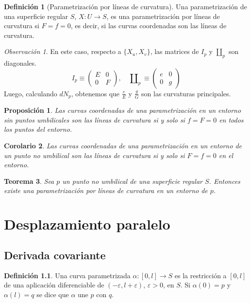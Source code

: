 \documentclass{report}
\newtheorem{theorem}{Teorema}[chapter]
\newtheorem{corollary}[theorem]{Corolario}
\newtheorem{proposition}[theorem]{Proposición}
\theoremstyle{remark}
\newtheorem*{remark}{Observación}
\theoremstyle{remark}
\theoremstyle{definition}
\newtheorem{definition}{Definición}[chapter]
\theoremstyle{definition}
\theoremstyle{definition}
\begin{document}
\begin{definition}[Parametrización por líneas de curvatura]
    Una parametrización de una superficie regular $S$, $X: U \to S$, es una parametrización por líneas de curvatura si $F = f = 0$, es decir, si las curvas coordenadas son las líneas de curvatura.
\end{definition}

\begin{remark}
    En este caso, respecto a $\{X_u, X_v\}$, las matrices de $I_p$ y $\amalg_p$ son diagonales.
    $$I_p \equiv
        \begin{pmatrix}
            E & 0 \\
            0 & F
        \end{pmatrix}, \quad
        \amalg_p \equiv
        \begin{pmatrix}
            e & 0 \\
            0 & g
        \end{pmatrix}$$
    Luego, calculando $dN_p$, obtenemos que $\frac{e}{E}$ y $\frac{g}{G}$ son las curvaturas principales.
\end{remark}

\begin{proposition}
    Las curvas coordenadas de una parametrización en un entorno sin puntos umbilicales son las líneas de curvatura si y solo si $f = F = 0$ en todos los puntos del entorno.
\end{proposition}

\begin{corollary}
    Las curvas coordenadas de una parametrización en un entorno de un punto no umbilical son las líneas de curvatura si y solo si $F = f = 0$ en el entorno.
\end{corollary}

\begin{theorem}
    Sea $p$ un punto no umbilical de una superficie regular $S$.
    Entonces existe una parametrización por líneas de curvatura en un entorno de $p$.
\end{theorem}

\chapter{Desplazamiento paralelo}
\section{Derivada covariante}

\begin{definition}
    Una curva parametrizada $\alpha : [0, l] \to S$ es la restricción a $[0, l]$ de una aplicación diferenciable de $(-\varepsilon, l+\varepsilon)$, $\varepsilon>0$, en $S$.
    Si $\alpha(0) = p$ y $\alpha(l) = q$ se dice que $\alpha$ une $p$ con $q$.
\end{definition}
\end{document}
